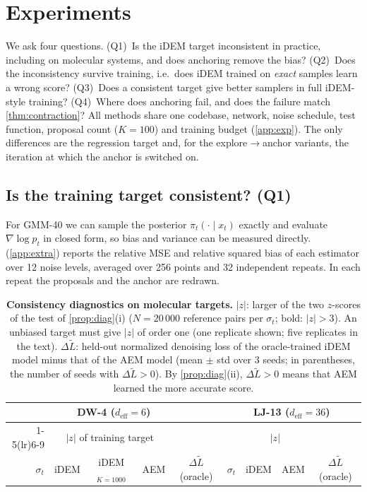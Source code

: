 \section{Experiments}
\label{sec:experiments}

We ask four questions.
(Q1)~Is the iDEM target inconsistent in practice, including on molecular systems, and does anchoring remove the bias?
(Q2)~Does the inconsistency survive training, i.e.\ does iDEM trained on \emph{exact} samples learn a wrong score?
(Q3)~Does a consistent target give better samplers in full iDEM-style training?
(Q4)~Where does anchoring fail, and does the failure match \cref{thm:contraction}?
All methods share one codebase, network, noise schedule, test function, proposal count ($K=100$) and training budget (\cref{app:exp}). The only differences are the regression target and, for the explore$\to$anchor variants, the iteration at which the anchor is switched on.

\subsection{Is the training target consistent? (Q1)}
\label{sec:exp-estimator}
For GMM-40 we can sample the posterior $\pi_t(\cdot\mid x_t)$ exactly and evaluate $\nabla\log p_t$ in closed form, so bias and variance can be measured directly.
 (\cref{app:extra}) reports the relative MSE and relative squared bias of each estimator over 12 noise levels, averaged over 256 points and 32 independent repeats. In each repeat the proposals and the anchor are redrawn.



\begin{table}[t]
\centering
\caption{\textbf{Consistency diagnostics on molecular targets.} $|z|$: larger of the two $z$-scores of the test of \cref{prop:diag}(i) ($N=20\,000$ reference pairs per $\sigma_t$; bold: $|z|>3$). An unbiased target must give $|z|$ of order one (one replicate shown; five replicates in the text). $\Delta\tilde L$: held-out normalized denoising loss of the oracle-trained iDEM model minus that of the AEM model (mean $\pm$ std over 3 seeds; in parentheses, the number of seeds with $\Delta\tilde L>0$). By \cref{prop:diag}(ii), $\Delta\tilde L>0$ means that AEM learned the more accurate score.}
\label{tab:diag}
\small
\setlength{\tabcolsep}{4pt}
\begin{tabular}{rccc c rcc c}
\toprule
\multicolumn{5}{c}{DW-4 ($d_{\mathrm{eff}}=6$)} & \multicolumn{4}{c}{LJ-13 ($d_{\mathrm{eff}}=36$)}\\
\cmidrule(lr){1-5}\cmidrule(lr){6-9}
& \multicolumn{3}{c}{$|z|$ of training target} & & & \multicolumn{2}{c}{$|z|$} & \\
$\sigma_t$ & iDEM & iDEM$_{K=1000}$ & AEM & $\Delta\tilde L$ (oracle) & $\sigma_t$ & iDEM & AEM & $\Delta\tilde L$ (oracle)\\
\midrule

\bottomrule
\end{tabular}
\end{table}

